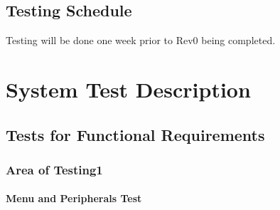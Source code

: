 \documentclass[12pt, titlepage]{article}
\begin{document}
\subsection{Testing Schedule}
Testing will be done one week prior to Rev0 being completed.

\section{System Test Description}
	
\subsection{Tests for Functional Requirements}

\subsubsection{Area of Testing1}
		
\paragraph{Menu and Peripherals Test}
\end{document}
